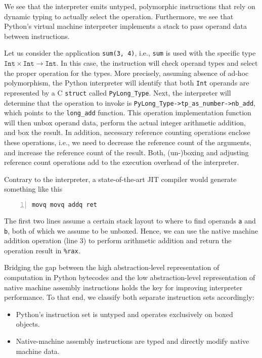 \documentclass[preprint,10pt]{popl14conf}
\newcommand{\pyType}[1]{\texttt{Py#1\_Type}}
\begin{document}
We see that the interpreter emits untyped, polymorphic instructions that rely on dynamic typing to
actually select the operation.
Furthermore, we see that Python's virtual machine interpreter implements a stack to pass operand
data between instructions.

Let us consider the application \texttt{sum(3, 4)}, i.e., \texttt{sum} is used with the specific
type $\mathtt{Int} \times \mathtt{Int} \rightarrow \mathtt{Int}$.
In this case, the \binaryAdd{} instruction will check operand types and select the proper operation
for the types.
More precisely, assuming absence of ad-hoc polymorphism, the Python interpreter will identify that
both \texttt{Int} operands are represented by a C \texttt{struct} called \pyType{Long}.
Next, the interpreter will determine that the operation to invoke is
\pyType{Long}\texttt{->tp_as_number->nb_add}, which points to the \texttt{long_add} function.
This operation implementation function will then unbox operand data, perform the actual integer
arithmetic addition, and box the result.
In addition, necessary reference counting operations enclose these operations, i.e., we need to
decrease the reference count of the arguments, and increase the reference count of the result.
Both, (un-)boxing and adjusting reference count operations add to the execution overhead of the
interpreter.

Contrary to the interpreter, a state-of-the-art JIT compiler would generate something like this
\begin{lstlisting}[morekeywords={rax,rbx,rsp,movq,addq,ret},numbers=left,numberstyle=\tiny,style=othercode]
movq movq addq ret
\end{lstlisting}
The first two lines assume a certain stack layout to where to find operands \texttt{a} and
\texttt{b}, both of which we assume to be unboxed.
Hence, we can use the native machine addition operation (line 3) to perform arithmetic addition and
return the operation result in \texttt{\%rax}.

Bridging the gap between the high abstraction-level representation of computation in Python
bytecodes and the low abstraction-level representation of native machine assembly instructions holds
the key for improving interpreter performance.
To that end, we classify both separate instruction sets accordingly:
\begin{itemize}
\item Python's instruction set is untyped and operates exclusively on boxed objects.
\item Native-machine assembly instructions are typed and directly modify native machine data.
\end{itemize}
\end{document}
